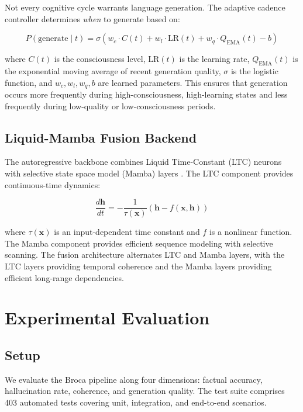 \documentclass[12pt,a4paper]{article}
\begin{document}
Not every cognitive cycle warrants language generation. The adaptive cadence controller determines \emph{when} to generate based on:

\begin{equation}
P(\text{generate} \mid t) = \sigma\left( w_c \cdot C(t) + w_l \cdot \text{LR}(t) + w_q \cdot Q_{\text{EMA}}(t) - b \right)
\end{equation}

where $C(t)$ is the consciousness level, $\text{LR}(t)$ is the learning rate, $Q_{\text{EMA}}(t)$ is the exponential moving average of recent generation quality, $\sigma$ is the logistic function, and $w_c, w_l, w_q, b$ are learned parameters. This ensures that generation occurs more frequently during high-consciousness, high-learning states and less frequently during low-quality or low-consciousness periods.

\subsection{Liquid-Mamba Fusion Backend}

The autoregressive backbone combines Liquid Time-Constant (LTC) neurons \citep{hasani2021liquid} with selective state space model (Mamba) layers \citep{gu2024mamba}. The LTC component provides continuous-time dynamics:

\begin{equation}
\frac{d\mathbf{h}}{dt} = -\frac{1}{\tau(\mathbf{x})} \left(\mathbf{h} - f(\mathbf{x}, \mathbf{h})\right)
\end{equation}

where $\tau(\mathbf{x})$ is an input-dependent time constant and $f$ is a nonlinear function. The Mamba component provides efficient sequence modeling with selective scanning. The fusion architecture alternates LTC and Mamba layers, with the LTC layers providing temporal coherence and the Mamba layers providing efficient long-range dependencies.

\section{Experimental Evaluation}

\subsection{Setup}

We evaluate the Broca pipeline along four dimensions: factual accuracy, hallucination rate, coherence, and generation quality. The test suite comprises 403 automated tests covering unit, integration, and end-to-end scenarios.
\end{document}
